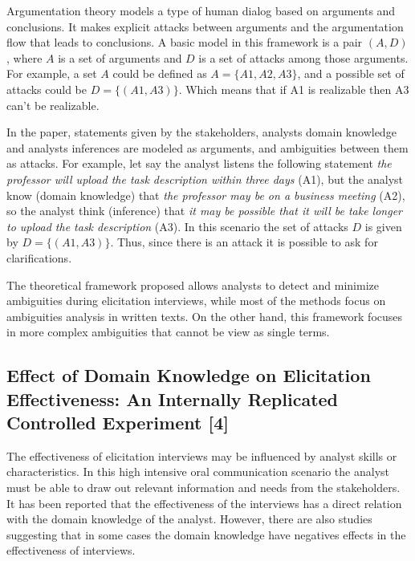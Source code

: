 \documentclass[]{llncs}
\begin{document}
Argumentation theory models a type of human dialog based on arguments
and conclusions. It makes explicit attacks between arguments and the
argumentation flow that leads to conclusions. A basic model in this
framework is a pair \((A,D)\), where \(A\) is a set of arguments and
\(D\) is a set of attacks among those arguments. For example, a set
\(A\) could be defined as \(A = \{A1,A2,A3\}\), and a possible set of
attacks could be \(D = \{(A1,A3)\}\). Which means that if A1 is
realizable then A3 can't be realizable.

In the paper, statements given by the stakeholders, analysts domain
knowledge and analysts inferences are modeled as arguments, and
ambiguities between them as attacks. For example, let say the analyst
listens the following statement \emph{the professor will upload the task
description within three days} (A1), but the analyst know (domain
knowledge) that \emph{the professor may be on a business meeting} (A2),
so the analyst think (inference) that \emph{it may be possible that it
will be take longer to upload the task description} (A3). In this
scenario the set of attacks \(D\) is given by \(D = \{(A1,A3)\}\). Thus,
since there is an attack it is possible to ask for clarifications.

The theoretical framework proposed allows analysts to detect and
minimize ambiguities during elicitation interviews, while most of the
methods focus on ambiguities analysis in written texts. On the other
hand, this framework focuses in more complex ambiguities that cannot be
view as single terms.

\hypertarget{effect-of-domain-knowledge-on-elicitation-effectiveness-an-internally-replicated-controlled-experiment-aranda2016effect}{%
\subsection{Effect of Domain Knowledge on Elicitation Effectiveness: An
Internally Replicated Controlled Experiment
{[}4{]}}\label{effect-of-domain-knowledge-on-elicitation-effectiveness-an-internally-replicated-controlled-experiment-aranda2016effect}}

The effectiveness of elicitation interviews may be influenced by analyst
skills or characteristics. In this high intensive oral communication
scenario the analyst must be able to draw out relevant information and
needs from the stakeholders. It has been reported that the effectiveness
of the interviews has a direct relation with the domain knowledge of the
analyst. However, there are also studies suggesting that in some cases
the domain knowledge have negatives effects in the effectiveness of
interviews.
\end{document}
